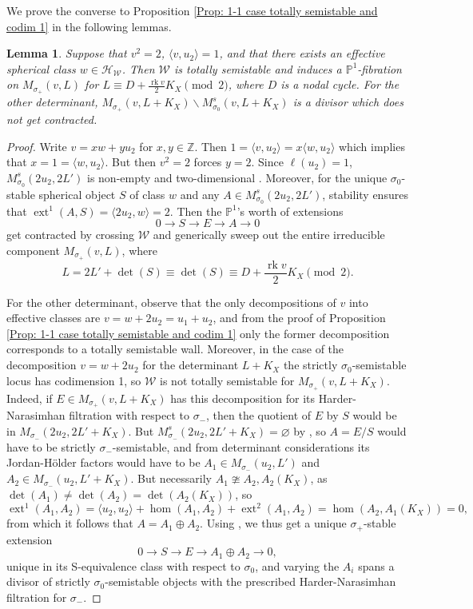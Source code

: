 \documentclass[leqno,11pt]{amsart}
\def\P{\ensuremath{\mathbb{P}}}
\def\Z{\ensuremath{\mathbb{Z}}}
\def\ext{\mathop{\mathrm{ext}}\nolimits}
\def\rk{\mathop{\mathrm{rk}}}
\newtheorem{Lem}[Thm]{Lemma}
\theoremstyle{definition}
\def\P{\ensuremath{\mathbb{P}}}
\def\Z{\ensuremath{\mathbb{Z}}}
\def\HH{\ensuremath{\mathcal H}}
\def\WW{\ensuremath{\mathcal W}}
\begin{document}
We prove the converse to Proposition \ref{Prop: 1-1 case totally semistable and codim 1} in the following lemmas.
\begin{Lem}\label{Lem:isotropic totally semistable divisorial contraction l=1}
Suppose that $v^2=2$, $\langle v,u_2\rangle=1$, and that there exists an effective spherical class $w\in\HH_{\WW}$.  Then $\WW$ is totally semistable and induces a $\P^1$-fibration on $M_{\sigma_+}(v,L)$ for $L\equiv D+\frac{\rk v}{2}K_X\pmod 2$, where $D$ is a nodal cycle.  For the other determinant, $M_{\sigma_+}(v,L+K_X)\backslash M_{\sigma_0}^s(v,L+K_X)$ is a divisor which does not get contracted.  
\end{Lem}
\begin{proof}
Write $v=xw+yu_2$ for $x,y\in\Z$.  Then $1=\langle v,u_2\rangle=x\langle w,u_2\rangle$ which implies that $x=1=\langle w,u_2\rangle$.  But then $v^2=2$ forces $y=2$.  Since $\ell(u_2)=1$, $M^s_{\sigma_0}(2u_2,2L')$ is non-empty and two-dimensional \cite[Proposition 1.9]{Yos16a}.  Moreover, for the unique $\sigma_0$-stable spherical object $S$ of class $w$ and any $A\in M^s_{\sigma_0}(2u_2,2L')$, stability ensures that $\ext^1(A,S)=\langle 2u_2,w\rangle=2$.  Then the $\P^1$'s worth of extensions $$0\to S\to E\to A\to 0$$ get contracted by crossing $\WW$ and generically sweep out the entire irreducible component $M_{\sigma_+}(v,L)$, where $$L=2L'+\det(S)\equiv \det(S)\equiv D+\frac{\rk v}{2}K_X\pmod 2.$$

For the other determinant, observe that the only decompositions of $v$ into effective classes are $v=w+2u_2=u_1+u_2$, and from the proof of Proposition \ref{Prop: 1-1 case totally semistable and codim 1} only the former decomposition corresponds to a totally semistable wall.  Moreover, in the case of the decomposition $v=w+2u_2$ for the determinant $L+K_X$ the strictly $\sigma_0$-semistable locus has codimension 1, so $\WW$ is not totally semistable for $M_{\sigma_+}(v,L+K_X)$.  Indeed, if $E\in M_{\sigma_+}(v,L+K_X)$ has this decomposition for its Harder-Narasimhan filtration with respect to $\sigma_-$, then the quotient of $E$ by $S$ would be in $M_{\sigma_-}(2u_2,2L'+K_X)$.  But $M_{\sigma_-}^s(2u_2,2L'+K_X)=\varnothing$ by \cite[Proposition 1.9]{Yos16a}, so $A=E/S$ would have to be strictly $\sigma_-$-semistable, and from determinant considerations its Jordan-H\"{o}lder factors would have to be $A_1\in M_{\sigma_-}(u_2,L')$ and $A_2\in M_{\sigma_-}(u_2,L'+K_X)$.  But necessarily $A_1\ncong A_2,A_2(K_X)$, as $\det(A_1)\neq\det(A_2)=\det(A_2(K_X))$, so $$\ext^1(A_1,A_2)=\langle u_2,u_2\rangle+\hom(A_1,A_2)+\ext^2(A_1,A_2)=\hom(A_2,A_1(K_X))=0,$$ from which it follows that $A=A_1\oplus A_2$.  Using \cite[Lemmas 6.1-6.3]{CH15}, we thus get a unique $\sigma_+$-stable extension $$0\to S\to E\to A_1\oplus A_2\to 0,$$ unique in its S-equivalence class with respect to $\sigma_0$, and varying the $A_i$ spans a divisor of strictly $\sigma_0$-semistable objects with the prescribed Harder-Narasimhan filtration for $\sigma_-$.  


\end{proof}
\end{document}
